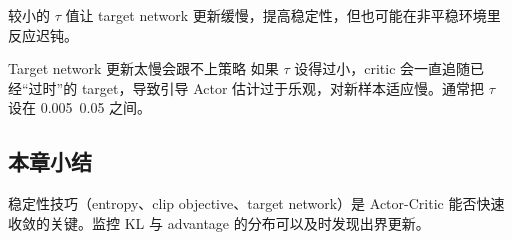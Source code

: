 较小的 $\tau$ 值让 target network 更新缓慢，提高稳定性，但也可能在非平稳环境里反应迟钝。

\begin{warningbox}{Target network 更新太慢会跟不上策略}
如果 $\tau$ 设得过小，critic 会一直追随已经“过时”的 target，导致引导 Actor 估计过于乐观，对新样本适应慢。通常把 $\tau$ 设在 0.005~0.05 之间。
\end{warningbox}

\subsection{本章小结}

稳定性技巧（entropy、clip objective、target network）是 Actor-Critic 能否快速收敛的关键。监控 KL 与 advantage 的分布可以及时发现出界更新。

